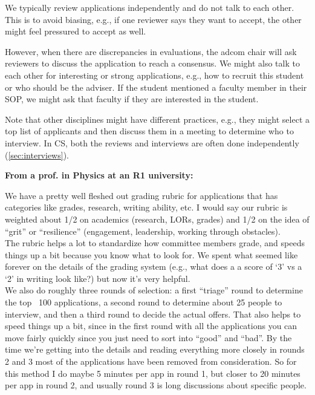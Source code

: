 \documentclass[oneside,11pt,dvipsnames]{book}
\newenvironment{commentbox}[1][]{
  \small
  \begin{mybox}
    {\small \textbf{#1}}
  }{
  \end{mybox}
}
\begin{document}
We typically review applications independently and do not talk to each other.  This is to avoid biasing, e.g., if one reviewer says they want to accept, the other might feel pressured to accept as well.  

However, when there are discrepancies in evaluations, the adcom chair will ask reviewers to discuss the application to reach a consensus.  We might also talk to each other for interesting or strong applications, e.g., how to recruit this student or who should be the adviser. 
If the student mentioned a faculty member in their SOP, we might ask that faculty if they are interested in the student. 


Note that other disciplines might have different practices, e.g., they might select a top list of applicants and then discuss them in a meeting to determine who to interview. In CS, both the reviews and interviews are often done independently (\autoref{sec:interviews}).

\begin{commentbox}[From a prof. in Physics at an R1 university:]
  We have a pretty well fleshed out grading rubric for applications that has categories like grades, research, writing ability, etc. I would say our rubric is weighted about 1/2 on academics (research, LORs, grades) and 1/2 on the idea of ``grit'' or ``resilience'' (engagement, leadership, working through obstacles).\\

  
  The rubric helps a lot to standardize how committee members grade, and speeds things up a bit because you know what to look for. We spent what seemed like forever on the details of the grading system (e.g., what does a a score of `3' vs a `2' in writing look like?) but now it's very helpful.\\
  

  We also do roughly three rounds of selection: a first ``triage'' round to determine the top ~100 applications, a second round to determine about 25 people to interview, and then a third round to decide the actual offers. That also helps to speed things up a bit, since in the first round with all the applications you can move fairly quickly since you just need to sort into ``good'' and ``bad''. By the time we're getting into the details and reading everything more closely in rounds 2 and 3 most of the applications have been removed from consideration. So for this method I do maybe 5 minutes per app in round 1, but closer to 20 minutes per app in round 2, and usually round 3 is long discussions about specific people.   
\end{commentbox}
\end{document}
